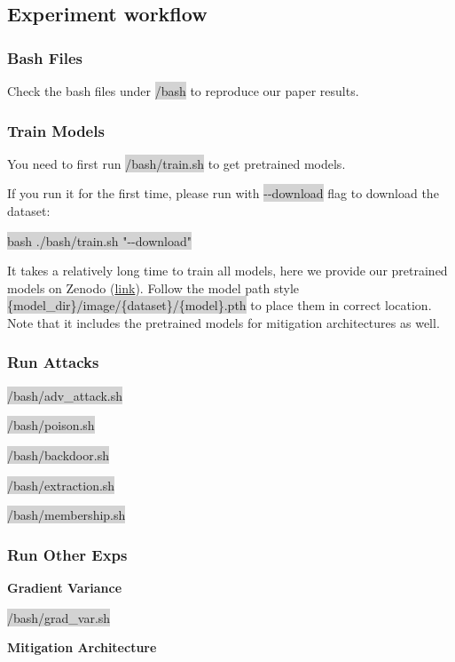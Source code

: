 \documentclass[letterpaper,twocolumn,10pt]{article}
\begin{document}
{{{{%
\subsection{Experiment workflow}
\subsubsection*{Bash Files}
Check the bash files under \colorbox{lightgray}{/bash} to reproduce our paper results.
\subsubsection*{Train Models}
You need to first run \colorbox{lightgray}{/bash/train.sh} to get pretrained models.

If you run it for the first time, please run with \colorbox{lightgray}{-{}-download} flag to download the dataset:

\colorbox{lightgray}{bash ./bash/train.sh "-{}-download"}

It takes a relatively long time to train all models, here we provide our pretrained models on Zenodo (\href{https://zenodo.org/record/5762440}{link}). Follow the model path style \colorbox{lightgray}{\{model\_dir\}/image/\{dataset\}/\{model\}.pth} to place them in correct location. Note that it includes the pretrained models for mitigation architectures as well.

\subsubsection*{Run Attacks}
\noindent
\colorbox{lightgray}{/bash/adv\_attack.sh}

\noindent
\colorbox{lightgray}{/bash/poison.sh}

\noindent
\colorbox{lightgray}{/bash/backdoor.sh}

\noindent
\colorbox{lightgray}{/bash/extraction.sh}

\noindent
\colorbox{lightgray}{/bash/membership.sh}

\subsubsection*{Run Other Exps}
\noindent
\textbf{Gradient Variance}

\noindent
\colorbox{lightgray}{/bash/grad\_var.sh}

\noindent
\textbf{Mitigation Architecture}

}}}}
\end{document}
